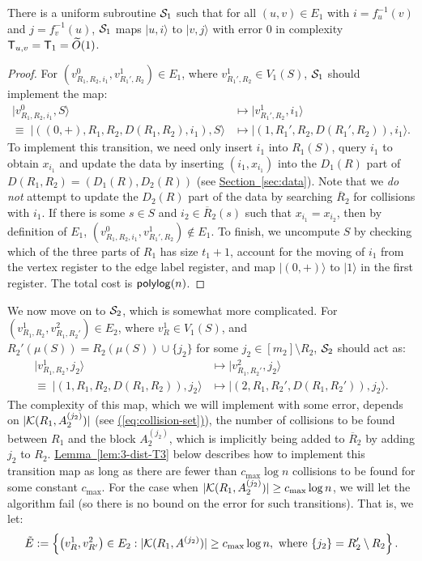 \documentclass{theoretics}
\newcommand{\eq}[1]{\hyperref[eq:#1]{(\ref*{eq:#1})}}
\renewcommand{\sec}[1]{\hyperref[sec:#1]{Section~\ref*{sec:#1}}}
\newcommand{\lem}[1]{\hyperref[lem:#1]{Lemma~\ref*{lem:#1}}}
\def\ket#1{{\lvert}#1\rangle}
\renewcommand{\>}{\rangle}
\newcommand{\<}{\langle}
\renewcommand{\(}{\left(}
\renewcommand{\)}{\right)}
\begin{document}
\begin{lemma}\label{lem:3-dist-T2}
There is a uniform subroutine ${\cal S}_1$ such that for all $(u,v)\in E_1$ with $i=f_u^{-1}(v)$ and $j=f_v^{-1}(u)$, ${\cal S}_1$ maps $\ket{u,i}$ to $\ket{v,j}$ with error 0 in complexity ${\sf T}_{u,v}={\sf T}_1=\widetilde{O}(1)$.
\end{lemma}
\begin{proof}
For $(v^0_{R_1,R_2,i_1},v^1_{R_1',R_2})\in E_1$, where $v^1_{R_1',R_2}\in V_1(S)$, ${\cal S}_1$ should implement the map:
\begin{align*}
\ket{v^0_{R_1,R_2,i_1},S} &\mapsto \ket{v^1_{R_1',R_2},i_1}\\
\equiv \; 
\ket{((0,+),R_1,R_2,D(R_1,R_2),i_1),S} &\mapsto \ket{(1,R_1',R_2,D(R_1',R_2)),i_1}.
\end{align*}
To implement this transition, we need only insert $i_1$ into $R_1(S)$, query $i_1$ to obtain $x_{i_1}$ and update the data by inserting $(i_1,x_{i_1})$ into the $D_1(R)$ part of $D(R_1,R_2)=(D_1(R),D_2(R))$ (see \sec{data}). Note that we \emph{do not} attempt to update the $D_2(R)$ part of the data by searching $\overline{R}_2$ for collisions with $i_1$.
If there is some $s\in S$ and $i_2\in \overline{R}_2(s)$ such that $x_{i_1}=x_{i_2}$, then by definition of $E_1$, $(v^0_{R_1,R_2,i_1},v^1_{R_1',R_2})\not\in E_1$. 
To finish, we uncompute $S$ by checking which of the three parts of $R_1$ has size $t_1+1$, account for the moving of $i_1$ from the vertex register to the edge label register, and map $\ket{(0,+)}$ to $\ket{1}$ in the first register. The total cost is ${\sf polylog}(n)$. 
\end{proof}

We now move on to ${\cal S}_2$, which is somewhat more complicated. For $(v^1_{R_1,R_2},v^2_{R_1,R_2'})\in E_2$,  where $v^1_R\in V_1(S)$, and $R_2'(\mu(S))=R_2(\mu(S))\cup\{j_2\}$ for some $j_2\in [m_2]\setminus R_2$, ${\cal S}_2$ should act as:
\begin{equation}
\begin{split}
\ket{v^1_{R_1,R_2},j_2} &\mapsto \ket{v^2_{R_1,R_2'},j_2}\\
\equiv \; 
\ket{(1,R_1,R_2,D(R_1,R_2)),j_2} &\mapsto \ket{(2,R_1,R_2',D(R_1,R_2')),j_2}.
\end{split}\label{eq:T3}
\end{equation}
The complexity of this map, which we will implement with some error, depends on  $|{\cal K}({R}_1,A_2^{(j_2)})|$ (see \eq{collision-set}), the number of collisions to be found between $R_1$ and the block $A_2^{(j_2)}$, which is implicitly being added to $\overline{R}_2$ by adding $j_2$ to $R_2$. 
\lem{3-dist-T3} below describes how to implement this transition map as long as there are fewer than $c_{\max}\log n$ collisions to be found for some constant $c_{\max}$. 
For the case when $|{\cal K}({R}_1,A_2^{(j_2)})|\geq c_{\max}\log n$, we will let the algorithm fail (so there is no bound on the error for such transitions). That is, we let:
\begin{equation}
\tilde{E}:=\left\{\left(v^1_{R},v^2_{R'}\right)\in E_2: |{\cal K}(R_1,A^{(j_2)})|\geq c_{\max}\log n,
\mbox{ where }\{j_2\}=R_2'\setminus R_2\right\}.\label{eq:3-dist-tilde-E}
\end{equation}
\end{document}

